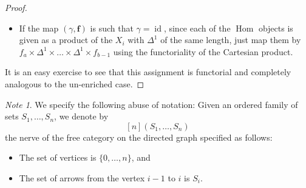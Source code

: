 \documentclass[leqno]{article}
\numberwithin{equation}{subsection}
\theoremstyle{plain}   %
\theoremstyle{remark}
\newtheorem{note}[equation]{Note}
\newtheorem{defn}[equation]{Definition}
\theoremstyle{plain}
\DeclareMathOperator{\id}{id}
\newcommand{\Cat}{\ensuremath{\mathbf{Cat}}}
\DeclareMathOperator{\Hom}{Hom}
\newcommand{\psh}[1]{\ensuremath{\widehat{#1}}}
\providecommand{\C}{}
\renewcommand{\C}{\ensuremath{\mathcal{C}}}
\newcommand{\cellset}{\ensuremath{\widehat{\Theta[\mathcal{C}]}}}
\newcommand{\spsh}{\ensuremath{\operatorname{Psh}_\Delta(\mathcal{C})}}
\begin{document}
\begin{proof}
\begin{itemize}
		\item If the map \((\gamma,\mathbf{f})\) is such that \(\gamma=\id\), since each of the \(\Hom\) objects is given as 	a product of the \(X_i\) with \(\Delta^1\) of the same length, just map them by \(f_a\times\Delta^1\times \dots 	\times\Delta^1 \times f_{b-1}\) using the functoriality of the Cartesian product.
	\end{itemize}
	It is an easy exercise to see that this assignment is functorial and completely analogous to the un-enriched case.
\end{proof}
\begin{comment}
	\begin{defn} Let \(\mathfrak{C}\) be the composite \[\Theta[\C]\hookrightarrow\Delta\int \psh{\C} \xrightarrow{Q} \Cat_{\spsh}.\] Since \(\Cat_{\spsh}\) is cocomplete, there exists a colimit-preserving extension to \(\cellset\), the \emph{homotopy-coherent realization}, which by abuse of notation, we also call \(\mathfrak{C}\).  It is the left adjoint in an adjunction \[\mathfrak{C}:\cellset\rightleftarrows \Cat_{\spsh}:\mathfrak{N},\]  wherein the right adjoint is called the \emph{homotopy-coherent nerve}.
	\end{defn}
\end{comment}

\begin{note}
	We specify the following abuse of notation: Given an ordered family of sets \(S_1,\dots, S_n\), we denote by
	\[
		[n](S_1,\dots,S_n)
	\]
	the nerve of the free category on the directed graph specified as follows:
	\begin{itemize}
		\item The set of vertices is \(\{0,\dots,n\}\), and
		\item The set of arrows from the vertex \(i-1\) to \(i\) is \(S_i\).
	\end{itemize}
\end{note}
\end{document}
